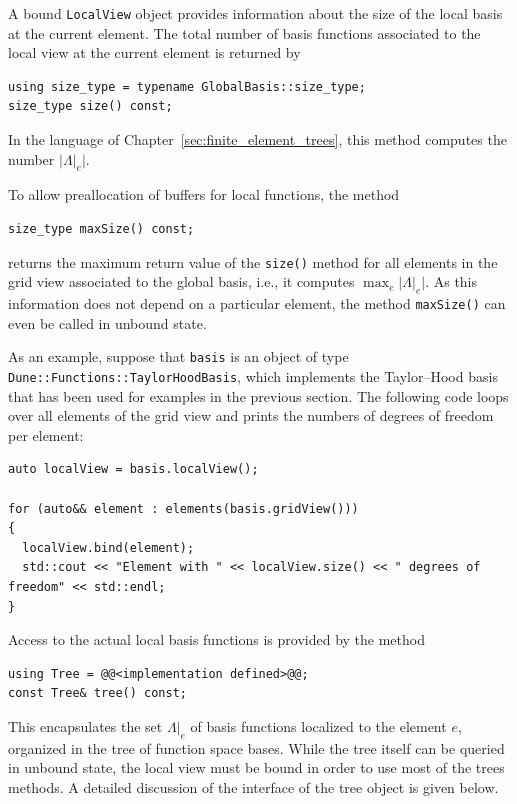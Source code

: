 \documentclass[a4paper,10pt,headings=normal,bibliography=totoc]{scrartcl}
\newcommand{\cpp}[1]{\lstinline[basicstyle=\ttfamily]!#1!}
\newcommand{\abs}[1]{{\lvert#1\rvert}}
\begin{document}
A bound \cpp{LocalView} object provides information
about the size of the local basis at the current element.
The total number of basis functions associated to the
local view at the current element is returned by
\begin{lstlisting}[style=Interface]
using size_type = typename GlobalBasis::size_type;
size_type size() const;
\end{lstlisting}
In the language of Chapter~\ref{sec:finite_element_trees}, this method computes
the number $\abs{\Lambda|_e}$.

To allow preallocation of buffers for local functions, the method
\begin{lstlisting}[style=Interface]
size_type maxSize() const;
\end{lstlisting}
returns the maximum return value of the
\cpp{size()} method for all elements in the grid view
associated to the global basis, i.e., it computes $\max_e \abs{\Lambda|_e}$.
As this information does not depend on a particular element,
the method \cpp{maxSize()} can even be called in unbound state.

As an example, suppose that \cpp{basis} is an object of type \cpp{Dune::Functions::TaylorHoodBasis},
which implements the Taylor--Hood basis that has been used for examples in the previous section.
The following code loops over all elements of the grid view and prints the numbers
of degrees of freedom per element:
\begin{lstlisting}[style=example]
auto localView = basis.localView();

for (auto&& element : elements(basis.gridView()))
{
  localView.bind(element);
  std::cout << "Element with " << localView.size() << " degrees of freedom" << std::endl;
}
\end{lstlisting}


Access to the actual local basis functions is provided
by the method
\begin{lstlisting}[style=Interface]
using Tree = @@<implementation defined>@@;
const Tree& tree() const;
\end{lstlisting}
This encapsulates the set $\Lambda|_e$ of basis functions localized to the
element $e$, organized in the tree of function space bases.
While the tree  itself can be queried in unbound state,
the local view must be bound in order to use most of the
trees methods.
A detailed discussion of the interface of the tree object is
given below.
\end{document}
